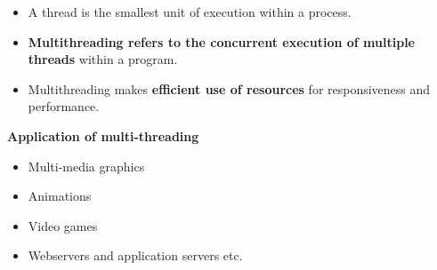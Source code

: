 \setlength{\columnsep}{3pt}
\begin{flushleft}
	
	\begin{itemize}
		\item A thread is the smallest unit of execution within a process.
		\item \textbf{Multithreading refers to the concurrent execution of multiple threads} within a program. 
		\item Multithreading makes \textbf{efficient use of resources} for responsiveness and performance.
		
		
	\end{itemize}
	
	\textbf{Application of multi-threading}
		\begin{itemize}
			\item Multi-media graphics
			\item Animations 
			\item Video games
			\item Webservers and application servers etc.
		\end{itemize}

	
\end{flushleft}

\newpage

